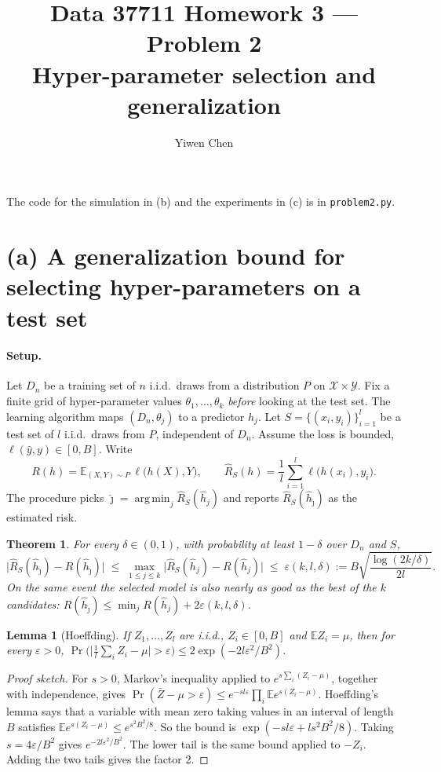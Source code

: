 \documentclass[11pt]{article}
\title{Data 37711 Homework 3 --- Problem 2\\
\large Hyper-parameter selection and generalization}
\author{Yiwen Chen}
\date{}
\newcommand{\E}{\mathbb{E}}
\DeclareMathOperator*{\argmin}{arg\,min}
\newtheorem{theorem}{Theorem}
\newtheorem{lemma}{Lemma}
\begin{document}
\maketitle
\sloppy

The code for the simulation in (b) and the experiments in (c) is in \texttt{problem2.py}.

\section*{(a) A generalization bound for selecting hyper-parameters on a test set}

\paragraph{Setup.}
Let $D_n$ be a training set of $n$ i.i.d.\ draws from a distribution $P$ on
$\mathcal X\times\mathcal Y$. Fix a finite grid of hyper-parameter values $\theta_1,\dots,\theta_k$
\emph{before} looking at the test set. The learning algorithm maps $(D_n,\theta_j)$ to a predictor
$\hat h_j$. Let $S=\{(x_i,y_i)\}_{i=1}^l$ be a test set of $l$ i.i.d.\ draws from $P$, independent
of $D_n$. Assume the loss is bounded, $\ell(\hat y,y)\in[0,B]$. Write
\[
R(h)=\E_{(X,Y)\sim P}\,\ell\bigl(h(X),Y\bigr),\qquad
\widehat R_S(h)=\frac1l\sum_{i=1}^l\ell\bigl(h(x_i),y_i\bigr).
\]
The procedure picks $\hat\jmath=\argmin_j\widehat R_S(\hat h_j)$ and reports
$\widehat R_S(\hat h_{\hat\jmath})$ as the estimated risk.

\begin{theorem}
For every $\delta\in(0,1)$, with probability at least $1-\delta$ over $D_n$ and $S$,
\[
\bigl|\widehat R_S(\hat h_{\hat\jmath})-R(\hat h_{\hat\jmath})\bigr|
\;\le\;\max_{1\le j\le k}\bigl|\widehat R_S(\hat h_j)-R(\hat h_j)\bigr|
\;\le\;\varepsilon(k,l,\delta):=B\sqrt{\frac{\log(2k/\delta)}{2l}} .
\]
On the same event the selected model is also nearly as good as the best of the $k$ candidates:
$R(\hat h_{\hat\jmath})\le\min_jR(\hat h_j)+2\varepsilon(k,l,\delta)$.
\end{theorem}

\begin{lemma}[Hoeffding]
If $Z_1,\dots,Z_l$ are i.i.d., $Z_i\in[0,B]$ and $\E Z_i=\mu$, then for every $\varepsilon>0$,
$\Pr\bigl(\bigl|\frac1l\sum_iZ_i-\mu\bigr|>\varepsilon\bigr)\le2\exp(-2l\varepsilon^2/B^2)$.
\end{lemma}
\begin{proof}[Proof sketch]
For $s>0$, Markov's inequality applied to $e^{s\sum_i(Z_i-\mu)}$, together with independence,
gives
$\Pr(\bar Z-\mu>\varepsilon)\le e^{-sl\varepsilon}\prod_i\E e^{s(Z_i-\mu)}$.
Hoeffding's lemma says that a variable with mean zero taking values in an interval of length $B$
satisfies $\E e^{s(Z_i-\mu)}\le e^{s^2B^2/8}$. So the bound is
$\exp(-sl\varepsilon+ls^2B^2/8)$. Taking $s=4\varepsilon/B^2$ gives $e^{-2l\varepsilon^2/B^2}$.
The lower tail is the same bound applied to $-Z_i$. Adding the two tails gives the factor 2.
\end{proof}
\end{document}
